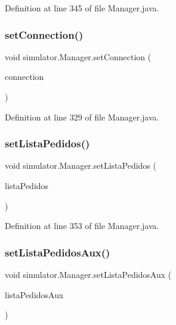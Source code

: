 Definition at line 345 of file Manager.\+java.

\mbox{\label{classsimulator_1_1_manager_adc747823ff8f856a79a78a30ae6788f9}} 
\subsubsection{\texorpdfstring{set\+Connection()}{setConnection()}}
{\footnotesize\ttfamily void simulator.\+Manager.\+set\+Connection (\begin{DoxyParamCaption}\item[{Connection}]{connection }\end{DoxyParamCaption})}



Definition at line 329 of file Manager.\+java.

\mbox{\label{classsimulator_1_1_manager_a3ac3fa3e9c1e559bbd50df24fe32fe33}} 
\subsubsection{\texorpdfstring{set\+Lista\+Pedidos()}{setListaPedidos()}}
{\footnotesize\ttfamily void simulator.\+Manager.\+set\+Lista\+Pedidos (\begin{DoxyParamCaption}\item[{Array\+List$<$ \mbox{\hyperlink{classsimulator_1_1_pedido}{Pedido}} $>$}]{lista\+Pedidos }\end{DoxyParamCaption})}



Definition at line 353 of file Manager.\+java.

\mbox{\label{classsimulator_1_1_manager_aa41c5e11ec1083566137aa868fea0049}} 
\subsubsection{\texorpdfstring{set\+Lista\+Pedidos\+Aux()}{setListaPedidosAux()}}
{\footnotesize\ttfamily void simulator.\+Manager.\+set\+Lista\+Pedidos\+Aux (\begin{DoxyParamCaption}\item[{Array\+List$<$ \mbox{\hyperlink{classsimulator_1_1_pedido}{Pedido}} $>$}]{lista\+Pedidos\+Aux }\end{DoxyParamCaption})}



